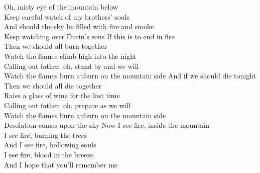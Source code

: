 
Oh, misty eye of the mountain below\\
Keep careful watch of my brothers' souls\\
And should the sky be filled with fire and smoke\\
Keep watching over Durin's sons \tab{}
\hops
If this is to end in fire \tab{}\tab{}\\
Then we should all burn together\tab{}\\
Watch the flames climb high into the night\tab{}\\
Calling out father, oh, stand by and we will \tab{}\\
Watch the flames burn auburn on the mountain side
\hop
And if we should die tonight\tab{}\tab{}\\
Then we should all die together\tab{}\\
Raise a glass of wine for the last time\tab{}\\
Calling out father, oh, prepare as we will\tab{}\\
Watch the flames burn auburn on the mountain side\\
Desolation comes upon the sky \tab{}
\hops
{} Now I see fire,  inside the mountain \\
 I see fire,  burning the trees \\
 And I see fire,  hollowing souls\\
 I see fire,  blood in the breeze\\
 And I hope that you'll remember me 
\hops

